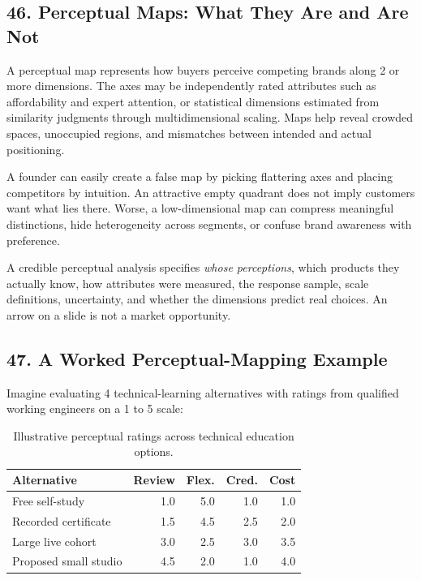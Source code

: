 \subsection*{46. Perceptual Maps: What They Are and Are Not}

A perceptual map represents how buyers perceive competing brands along 2 or more dimensions. The axes may be independently rated attributes such as affordability and expert attention, or statistical dimensions estimated from similarity judgments through multidimensional scaling. Maps help reveal crowded spaces, unoccupied regions, and mismatches between intended and actual positioning.

A founder can easily create a false map by picking flattering axes and placing competitors by intuition. An attractive empty quadrant does not imply customers want what lies there. Worse, a low-dimensional map can compress meaningful distinctions, hide heterogeneity across segments, or confuse brand awareness with preference.

A credible perceptual analysis specifies \emph{whose perceptions}, which products they actually know, how attributes were measured, the response sample, scale definitions, uncertainty, and whether the dimensions predict real choices. An arrow on a slide is not a market opportunity.

\subsection*{47. A Worked Perceptual-Mapping Example}

Imagine evaluating 4 technical-learning alternatives with ratings from qualified working engineers on a 1 to 5 scale:

\begin{table}[htbp]
\centering
\small
\begin{tabularx}{\columnwidth}{>{\raggedright\arraybackslash}p{2.6cm} r r r r}
\toprule
\textbf{Alternative} & \textbf{Review} & \textbf{Flex.} & \textbf{Cred.} & \textbf{Cost} \\
\midrule
Free self-study & 1.0 & 5.0 & 1.0 & 1.0 \\
Recorded certificate & 1.5 & 4.5 & 2.5 & 2.0 \\
Large live cohort & 3.0 & 2.5 & 3.0 & 3.5 \\
Proposed small studio & 4.5 & 2.0 & 1.0 & 4.0 \\
\bottomrule
\end{tabularx}
\caption{Illustrative perceptual ratings across technical education options.}
\label{tab:ch8-perceptual-ratings}
\end{table}

